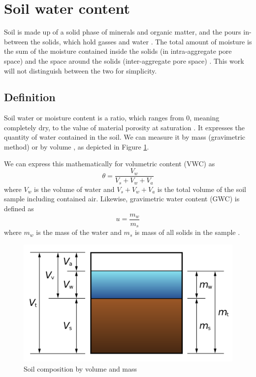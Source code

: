 
\section{Soil water content}
Soil is made up of a solid phase of minerals and organic matter, and the pours in-between the solids, which hold gasses and water \cite{paul_soil_2007}. The total amount of moisture is the sum of the moisture contained inside the solids (in intra-aggregate pore space) and the space around the solids (inter-aggregate pore space) \cite{myjove_corporation_determination_2024}. This work will not distinguish between the two for simplicity.

\subsection{Definition}
Soil water or moisture content is a ratio, which ranges from 0, meaning completely dry, to the value of material porosity at saturation \cite{webster_humidity_1998}. It expresses the quantity of water contained in the soil. We can measure it by mass (gravimetric method) or by volume , as depicted in Figure \ref{fig:soil-phase-diagram}.

We can express this mathematically for volumetric content (VWC) as
\begin{equation}
    \label{equation:volumetric-content} \theta = \dfrac{V_w}{V_s + V_w + V_a}
\end{equation}
where $V_w$ is the volume of water and $V_s + V_w + V_a$ is the total volume of the soil sample including contained air. Likewise, gravimetric water content (GWC) is defined as
\begin{equation}
    \label{equation:gravimetric-content} u = \dfrac{m_w}{m_s}
\end{equation}
where $m_w$ is the mass of the water and $m_s$ is mass of all solids in the sample \cite{edaphic_scientific_pty_ltd_how_2024}.

\begin{figure}
    \includegraphics[width=.5\textwidth]{fig/soil-phase-diagram.png}
    \caption{\label{fig:soil-phase-diagram} Soil composition by volume and mass \cite{noauthor_water_2023}}
\end{figure}

